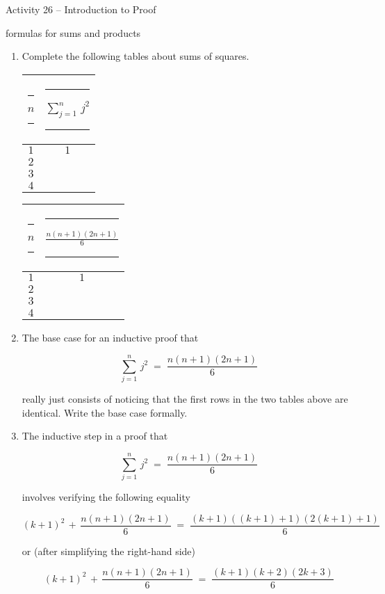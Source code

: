 \documentclass{amsart}
\newcommand{\hs}{\rule{18pt}{0pt}}
\newcommand{\vs}{\rule[-16pt]{0pt}{32pt}}
\begin{document}
\thispagestyle{empty}

\centerline{\Large Activity 26 -- Introduction to Proof}
\centerline{\large formulas for sums and products}

\bigskip
\Large


\begin{enumerate}
\item Complete the following tables about sums of squares.
\bigskip

\begin{tabular}{c|c}
\vs\hs $n$ \hs & \hs $\displaystyle \sum_{j=1}^n \, j^2$ \hs \\ \hline
\vs $1$ & $1$ \\
\vs $2$ & \\
\vs $3$ & \\
\vs $4$ & \\
\end{tabular}
\hspace{.5in}
\begin{tabular}{c|c}
\vs \hs $n$ \hs & \hs $\displaystyle \frac{n(n + 1)(2n + 1)}{6}$ \hs \\ \hline
\vs $1$ & $1$ \\
\vs $2$ & \\
\vs $3$ & \\
\vs $4$ & \\
\end{tabular}

\vspace{.3in}

\item The base case for an inductive proof that

\[ \sum_{j=1}^n \, j^2 \; = \; \frac{n(n + 1)(2n + 1)}{6}\]

really just consists of noticing that the first rows in the two tables
above are identical. Write the base case formally.

\vfill

\newpage

\item The inductive step in a proof that

\[ \sum_{j=1}^n \, j^2 \; = \; \frac{n(n + 1)(2n + 1)}{6}\]

involves verifying the following equality

\[ (k + 1)^2 \, + \, \frac{n(n + 1)(2n + 1)}{6} \; = \; 
\frac{(k + 1)((k + 1) + 1)(2(k + 1) + 1)}{6}
\]

or (after simplifying the right-hand side)

\[ (k + 1)^2 \, + \, \frac{n(n + 1)(2n + 1)}{6} \; = \; 
\frac{(k + 1)(k + 2)(2k + 3)}{6}
\]


\end{enumerate}
\end{document}
